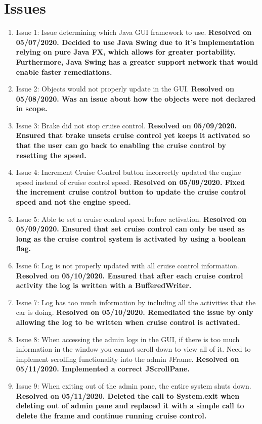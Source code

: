 \documentclass[preprint,11pt,3p]{article}
\begin{document}
\section{Issues}
\begin{enumerate} 
	\item Issue 1: Issue determining which Java GUI framework to use. \textbf{Resolved on 05/07/2020. Decided to use Java Swing due to it's implementation relying on pure Java FX, which allows for greater portability. Furthermore, Java Swing has a greater support network that would enable faster remediations.}
	\item Issue 2: Objects would not properly update in the GUI. \textbf{Resolved on 05/08/2020. Was an issue about how the objects were not declared in scope.}
	\item Issue 3: Brake did not stop cruise control. \textbf{Resolved on 05/09/2020. Ensured that brake unsets cruise control yet keeps it activated so that the user can go back to enabling the cruise control by resetting the speed.}
	\item Issue 4: Increment Cruise Control button incorrectly updated the engine speed instead of cruise control speed. \textbf{Resolved on 05/09/2020. Fixed the increment cruise control button to update the cruise control speed and not the engine speed.}
	\item Issue 5: Able to set a cruise control speed before activation. \textbf{Resolved on 05/09/2020. Ensured that set cruise control can only be used as long as the cruise control system is activated by using a boolean flag.}
	\item Issue 6: Log is not properly updated with all cruise control information. \textbf{Resolved on 05/10/2020. Ensured that after each cruise control activity the log is written with a BufferedWriter.}
	\item Issue 7: Log has too much information by including all the activities that the car is doing. \textbf{Resolved on 05/10/2020. Remediated the issue by only allowing the log to be written when cruise control is activated.}
	\item Issue 8: When accessing the admin logs in the GUI, if there is too much information in the window you cannot scroll down to view all of it. Need to implement scrolling functionality into the admin JFrame. \textbf{Resolved on 05/11/2020. Implemented a correct JScrollPane.} 
	\item Issue 9: When exiting out of the admin pane, the entire system shuts down. \textbf{Resolved on 05/11/2020. Deleted the call to System.exit when deleting out of admin pane and replaced it with a simple call to delete the frame and continue running cruise control.}

\end{enumerate}
\end{document}
